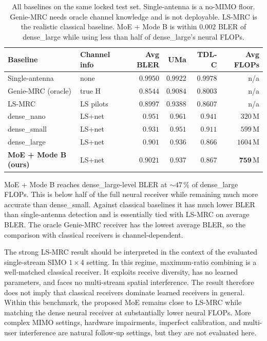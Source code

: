\begin{table}[h]
\centering
\footnotesize
\setlength{\tabcolsep}{4pt}
\begin{tabular}{l l r r r r}
\toprule
Baseline & Channel info & Avg BLER & UMa & TDL-C & Avg FLOPs \\
\midrule
Single-antenna           & none      & $0.9950$ & $0.9922$ & $0.9978$ & n/a \\
Genie-MRC (oracle) & true H    & $\mathbf{0.8544}$ & $0.9084$ & $0.8003$ & n/a \\
LS-MRC             & LS pilots & $0.8997$ & $0.9388$ & $0.8607$ & n/a \\
\midrule
dense\_nano  & LS+net    & $0.951$  & $0.961$  & $0.941$  & $320$\,M \\
dense\_small & LS+net    & $0.931$  & $0.951$  & $0.911$  & $599$\,M \\
dense\_large & LS+net    & $0.901$  & $0.936$  & $0.866$  & $1604$\,M \\
\midrule
\textbf{MoE + Mode B (ours)} & LS+net & $\mathbf{0.9021}$ & $0.937$ & $0.867$ & $\mathbf{759}$\,M \\
\bottomrule
\end{tabular}
\caption{All baselines on the same locked test set. Single-antenna is a no-MIMO floor. Genie-MRC needs oracle channel knowledge and is not deployable. LS-MRC is the realistic classical baseline. MoE + Mode B is within $0.002$ BLER of dense\_large while using less than half of dense\_large's neural FLOPs.}
\label{tab:baselines}
\end{table}

MoE + Mode B reaches dense\_large-level BLER at $\sim 47\,\%$ of dense\_large FLOPs. This is below half of the full neural receiver while remaining much more accurate than dense\_small. Against classical baselines it has much lower BLER than single-antenna detection and is essentially tied with LS-MRC on average BLER. The oracle Genie-MRC receiver has the lowest average BLER, so the comparison with classical receivers is channel-dependent.

The strong LS-MRC result should be interpreted in the context of the evaluated single-stream SIMO $1{\times}4$ setting. In this regime, maximum-ratio combining is a well-matched classical receiver. It exploits receive diversity, has no learned parameters, and faces no multi-stream spatial interference. The result therefore does not imply that classical receivers dominate learned receivers in general. Within this benchmark, the proposed MoE remains close to LS-MRC while matching the dense neural receiver at substantially lower neural FLOPs. More complex MIMO settings, hardware impairments, imperfect calibration, and multi-user interference are natural follow-up settings, but they are not evaluated here.

